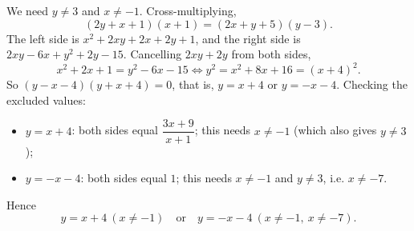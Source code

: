 We need $y\ne3$ and $x\ne-1$. Cross-multiplying,
\[(2y+x+1)(x+1)=(2x+y+5)(y-3).\]
The left side is $x^2+2xy+2x+2y+1$, and the right side is $2xy-6x+y^2+2y-15$. Cancelling $2xy+2y$ from both sides,
\[x^2+2x+1=y^2-6x-15\iff y^2=x^2+8x+16=(x+4)^2.\]
So $(y-x-4)(y+x+4)=0$, that is, $y=x+4$ or $y=-x-4$. Checking the excluded values:
\begin{itemize}
\item $y=x+4$: both sides equal $\dfrac{3x+9}{x+1}$; this needs $x\ne-1$ (which also gives $y\ne3$);
\item $y=-x-4$: both sides equal $1$; this needs $x\ne-1$ and $y\ne3$, i.e. $x\ne-7$.
\end{itemize}
Hence
\[\boxed{y=x+4\ (x\ne-1)\quad\text{or}\quad y=-x-4\ (x\ne-1,\ x\ne-7)}.\]
